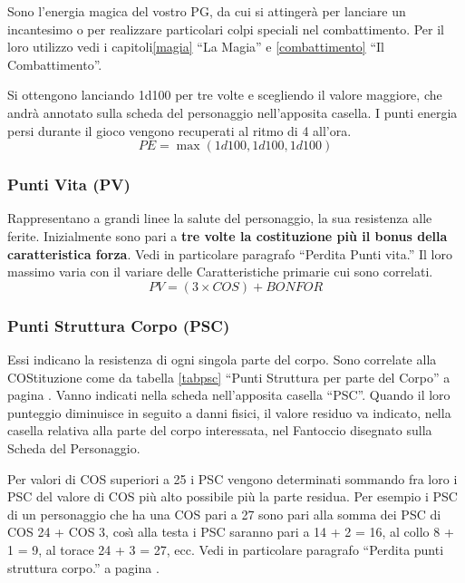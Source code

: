 Sono l'energia magica del vostro PG, da cui si attinger\`a per
lanciare un incantesimo o per realizzare particolari colpi speciali
nel combattimento. Per il loro utilizzo vedi i capitoli\ref{magia}
``La Magia'' e \ref{combattimento} ``Il Combattimento''.

Si ottengono lanciando 1d100 per tre volte e scegliendo il valore
maggiore, che andr\`a annotato sulla scheda del personaggio
nell'apposita casella.  I punti energia persi durante il gioco vengono
recuperati al ritmo di 4 all'ora.
$$PE=\max(1d100, 1d100, 1d100)$$

\subsubsection{Punti Vita (PV)}

Rappresentano a grandi linee la salute del personaggio, la sua
resistenza alle ferite. Inizialmente sono pari a \textbf{tre volte la
  costituzione pi\`u il bonus della caratteristica forza}. Vedi in
particolare paragrafo ``Perdita Punti vita.'' Il loro massimo varia
con il variare delle Caratteristiche primarie cui sono correlati.
$$PV=(3 \times COS) + BON FOR$$

\subsubsection{Punti Struttura Corpo (PSC)}

Essi indicano la resistenza di ogni singola parte del corpo. Sono
correlate alla COStituzione come da tabella \ref{tabpsc} ``Punti
Struttura per parte del Corpo'' a pagina \pageref{tabpsc}.  Vanno
indicati nella scheda nell'apposita casella ``PSC''. Quando il loro
punteggio diminuisce in seguito a danni fisici, il valore residuo va
indicato, nella casella relativa alla parte del corpo interessata, nel
Fantoccio disegnato sulla Scheda del Personaggio.

Per valori di COS superiori a 25 i PSC vengono determinati sommando fra
loro i PSC del valore di COS pi\`u alto possibile pi\`u la parte
residua. Per esempio i PSC di un personaggio che ha una COS pari a 27
sono pari alla somma dei PSC di COS 24 + COS 3, cos\`{\i} alla testa i
PSC saranno pari a 14 + 2 = 16, al collo 8 + 1 = 9, al torace 24 + 3 =
27, ecc. Vedi in particolare paragrafo ``Perdita punti struttura
corpo.'' a pagina \pageref{perditapvpsc}.


